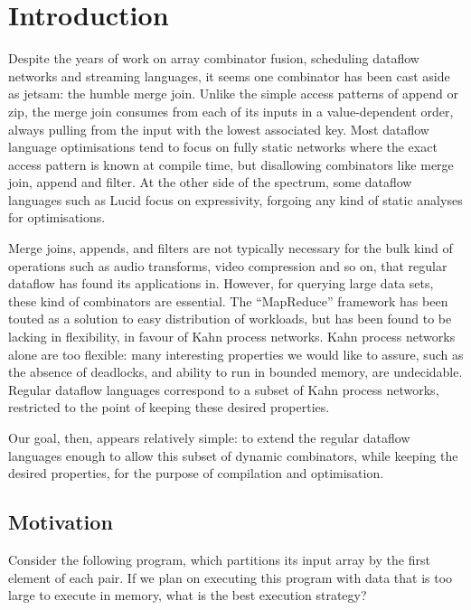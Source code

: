 \section{Introduction}
\label{s:Introduction}

Despite the years of work on array combinator fusion, scheduling dataflow networks and streaming languages, it seems one combinator has been cast aside as jetsam: the humble merge join.
Unlike the simple access patterns of append or zip, the merge join consumes from each of its inputs in a value-dependent order, always pulling from the input with the lowest associated key.
Most dataflow language optimisations tend to focus on fully static networks where the exact access pattern is known at compile time\cite{thies2002streamit}, but disallowing combinators like merge join, append and filter.
At the other side of the spectrum, some dataflow languages such as Lucid\cite{stephens1997survey} focus on expressivity, forgoing any kind of static analyses for optimisations.

Merge joins, appends, and filters are not typically necessary for the bulk kind of operations such as audio transforms, video compression and so on, that regular dataflow has found its applications in\cite{johnston2004advances}.
However, for querying large data sets, these kind of combinators are essential.
The ``MapReduce'' framework has been touted as a solution to easy distribution of workloads, but has been found to be lacking in flexibility\cite{vrba2009kahn}, in favour of Kahn process networks.
Kahn process networks alone are too flexible: many interesting properties we would like to assure, such as the absence of deadlocks, and ability to run in bounded memory, are undecidable.
Regular dataflow languages correspond to a subset of Kahn process networks, restricted to the point of keeping these desired properties\cite{thies2009language}.

Our goal, then, appears relatively simple: to extend the regular dataflow languages enough to allow this subset of dynamic combinators, while keeping the desired properties, for the purpose of compilation and optimisation.

\subsection{Motivation}

Consider the following program, which partitions its input array by the first element of each pair.
If we plan on executing this program with data that is too large to execute in memory, what is the best execution strategy?

